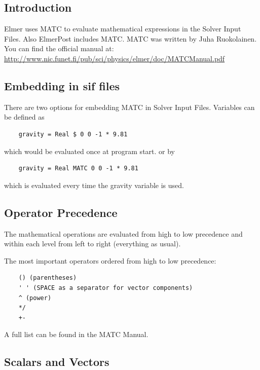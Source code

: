 \subsection{Introduction}

Elmer uses MATC to evaluate mathematical expressions in the Solver Input Files. Also ElmerPost includes MATC.  MATC was written by Juha Ruokolainen.  You can find the official manual at:\\

\url{http://www.nic.funet.fi/pub/sci/physics/elmer/doc/MATCManual.pdf}

\subsection{Embedding in sif files}

There are two options for embedding MATC in Solver Input Files. Variables can be defined as

\begin{verbatim}
    gravity = Real $ 0 0 -1 * 9.81
\end{verbatim}

\noindent which would be evaluated once at program start. or by

\begin{verbatim}
    gravity = Real MATC 0 0 -1 * 9.81
\end{verbatim}

\noindent which is evaluated every time the gravity variable is used.

\subsection{Operator Precedence}

The mathematical operations are evaluated from high to low precedence and within each level from left to right (everything as usual).

\noindent The most important operators ordered from high to low precedence:

\begin{verbatim}
    () (parentheses)
    ' ' (SPACE as a separator for vector components)
    ^ (power)
    */ 
    +- 
\end{verbatim}

\noindent A full list can be found in the MATC Manual.

\subsection{Scalars and Vectors}

